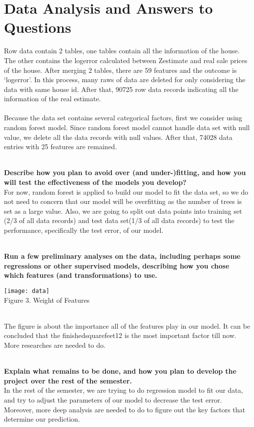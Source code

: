 \documentclass[12pt]{article}
\begin{document}
\section{Data Analysis and Answers to Questions}
Row data contain 2 tables, one tables contain all the information of the house. The other contains the logerror calculated between Zestimate and real sale prices of the house.
After merging 2 tables, there are 59 features and the outcome is ‘logerror’. In this process, many raws of data are deleted for only considering the data with same house id. After that, 90725 row data records indicating all the information of the real estimate. \\
\\Because the data set contains several categorical factors, first we consider using random forest model. Since random forest model cannot handle data set with null value, we delete all the data records with null values. After that, 74028 data entries with 25 features are remained.
 
\textbf{\\Describe how you plan to avoid over (and under-)fitting, and how you will test the effectiveness of the models you develop?}
\\For now, random forest is applied to build our model to fit the data set, so we do not need to concern that our model will be overfitting as the number of trees is set as a large value. 
Also, we are going to split out data points into training set (2/3 of all data records) and test data set(1/3 of all data records) to test the performance, specifically the test error, of our model. 

\textbf{\\Run a few preliminary analyses on the data, including perhaps some regressions or other supervised models, describing how you chose which features (and transformations) to use.}
\begin{center}
\texttt{[image: data]}\\
Figure 3. Weight of Features
\end{center}
\\The figure is about the importance all of the features play in our model. It can be concluded that the finishedsquarefeet12 is the most important factor till now. More researches are needed to do.

\textbf{ \\Explain what remains to be done, and how you plan to develop the project over the rest of the semester.}
\\In the rest of the semester, we are trying to do regression model to fit our data, and try to adjust the parameters of our model to decrease the test error. Moreover, more deep analysis are needed to do to figure out the key factors that determine our prediction.
\end{document}
